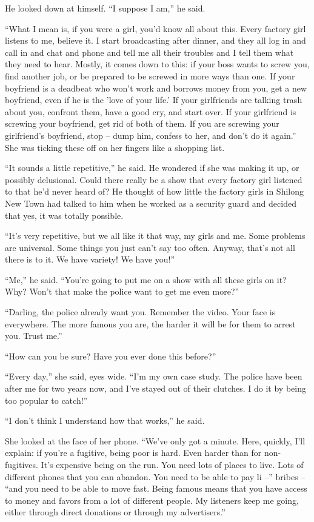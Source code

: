 He looked down at himself. ``I suppose I am,'' he said.

``What I mean is, if you were a girl, you'd know all about this.
Every factory girl listens to me, believe it. I start broadcasting
after dinner, and they all log in and call in and chat and phone
and tell me all their troubles and I tell them what they need to
hear. Mostly, it comes down to this: if your boss wants to screw
you, find another job, or be prepared to be screwed in more ways
than one. If your boyfriend is a deadbeat who won't work and
borrows money from you, get a new boyfriend, even if he is the
'love of your life.' If your girlfriends are talking trash about
you, confront them, have a good cry, and start over. If your
girlfriend is screwing your boyfriend, get rid of both of them. If
you are screwing your girlfriend's boyfriend, stop -- dump him,
confess to her, and don't do it again.'' She was ticking these off
on her fingers like a shopping list.

``It sounds a little repetitive,'' he said. He wondered if she was
making it up, or possibly delusional. Could there really be a show
that every factory girl listened to that he'd never heard of? He
thought of how little the factory girls in Shilong New Town had
talked to him when he worked as a security guard and decided that
yes, it was totally possible.

``It's very repetitive, but we all like it that way, my girls and
me. Some problems are universal. Some things you just can't say too
often. Anyway, that's not all there is to it. We have variety! We
have you!''

``Me,'' he said. ``You're going to put me on a show with all these
girls on it? Why? Won't that make the police want to get me even
more?''

``Darling, the police already want you. Remember the video. Your
face is everywhere. The more famous you are, the harder it will be
for them to arrest you. Trust me.''

``How can you be sure? Have you ever done this before?''

``Every day,'' she said, eyes wide. ``I'm my own case study. The
police have been after me for two years now, and I've stayed out of
their clutches. I do it by being too popular to catch!''

``I don't think I understand how that works,'' he said.

She looked at the face of her phone. ``We've only got a minute.
Here, quickly, I'll explain: if you're a fugitive, being poor is
hard. Even harder than for non-fugitives. It's expensive being on
the run. You need lots of places to live. Lots of different phones
that you can abandon. You need to be able to pay li --'' bribes --
``and you need to be able to move fast. Being famous means that you
have access to money and favors from a lot of different people. My
listeners keep me going, either through direct donations or through
my advertisers.''

